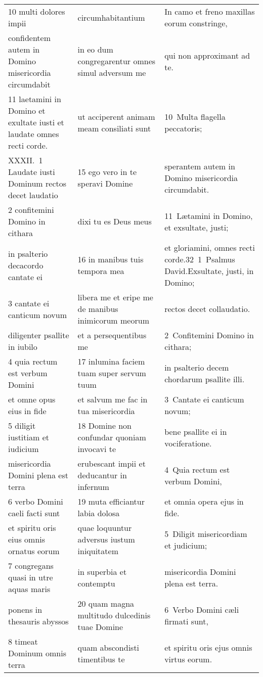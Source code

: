 \documentclass{article}
\begin{document}
\begin{longtable}{@{}p{}p{}p{}@{}}
10 multi dolores impii	&	circumhabitantium	&	In camo et freno maxillas eorum constringe,	\\
confidentem autem in Domino misericordia circumdabit	&	in eo dum congregarentur omnes simul adversum me	&	qui non approximant ad te.	\\
11 laetamini in Domino et exultate iusti et laudate omnes recti corde.	&	ut acciperent animam meam consiliati sunt	&	10 Multa flagella peccatoris;	\\
XXXII. 1 Laudate iusti Dominum rectos decet laudatio	&	15 ego vero in te speravi Domine	&	sperantem autem in Domino misericordia circumdabit.	\\
2 confitemini Domino in cithara	&	dixi tu es Deus meus	&	11 Lætamini in Domino, et exsultate, justi;	\\
in psalterio decacordo cantate ei	&	16 in manibus tuis tempora mea	&	et gloriamini, omnes recti corde.32 1 Psalmus David.Exsultate, justi, in Domino;	\\
3 cantate ei canticum novum	&	libera me et eripe me de manibus inimicorum meorum	&	rectos decet collaudatio.	\\
diligenter psallite in iubilo	&	et a persequentibus me	&	2 Confitemini Domino in cithara;	\\
4 quia rectum est verbum Domini	&	17 inlumina faciem tuam super servum tuum	&	in psalterio decem chordarum psallite illi.	\\
et omne opus eius in fide	&	et salvum me fac in tua misericordia	&	3 Cantate ei canticum novum;	\\
5 diligit iustitiam et iudicium	&	18 Domine non confundar quoniam invocavi te	&	bene psallite ei in vociferatione.	\\
misericordia Domini plena est terra	&	erubescant impii et deducantur in infernum	&	4 Quia rectum est verbum Domini,	\\
6 verbo Domini caeli facti sunt	&	19 muta efficiantur labia dolosa	&	et omnia opera ejus in fide.	\\
et spiritu oris eius omnis ornatus eorum	&	quae loquuntur adversus iustum iniquitatem	&	5 Diligit misericordiam et judicium;	\\
7 congregans quasi in utre aquas maris	&	in superbia et contemptu	&	misericordia Domini plena est terra.	\\
ponens in thesauris abyssos	&	20 quam magna multitudo dulcedinis tuae Domine	&	6 Verbo Domini cæli firmati sunt,	\\
8 timeat Dominum omnis terra	&	quam abscondisti timentibus te	&	et spiritu oris ejus omnis virtus eorum.	\\

\end{longtable}
\end{document}
